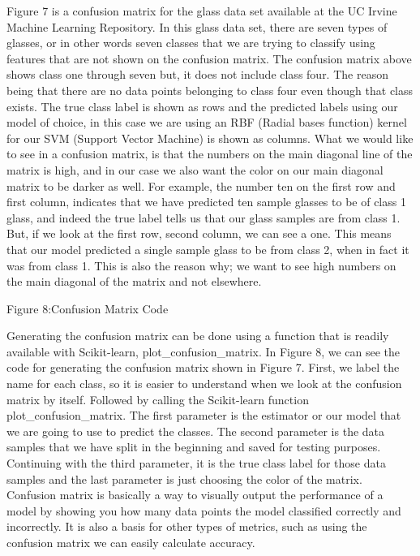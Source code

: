 \documentclass[a4paper,12pt]{report}
\begin{document}
Figure 7 is a confusion matrix for the glass data set available at the UC Irvine Machine Learning Repository. In this glass data set, there are seven types of glasses, or in other words seven classes that we are trying to classify using features that are not shown on the confusion matrix. The confusion matrix above shows class one through seven but, it does not include class four. The reason being that there are no data points belonging to class four even though that class exists. The true class label is shown as rows and the predicted labels using our model of choice, in this case we are using an RBF (Radial bases function) kernel for our SVM (Support Vector Machine) is shown as columns. What we would like to see in a confusion matrix, is that the numbers on the main diagonal line of the matrix is high, and in our case we also want the color on our main diagonal matrix to be darker as well. For example, the number ten on the first row and first column, indicates that we have predicted ten sample glasses to be of class 1 glass, and indeed the true label tells us that our glass samples are from class 1. But, if we look at the first row, second column, we can see a one. This means that our model predicted a single sample glass to be from class 2, when in fact it was from class 1. This is also the reason why; we want to see high numbers on the main diagonal of the matrix and not elsewhere.


Figure 8:Confusion Matrix Code

Generating the confusion matrix can be done using a function that is readily available with Scikit-learn, plot\_confusion\_matrix. In Figure 8, we can see the code for generating the confusion matrix shown in Figure 7. First, we label the name for each class, so it is easier to understand when we look at the confusion matrix by itself. Followed by calling the Scikit-learn function plot\_confusion\_matrix. The first parameter is the estimator or our model that we are going to use to predict the classes. The second parameter is the data samples that we have split in the beginning and saved for testing purposes. Continuing with the third parameter, it is the true class label for those data samples and the last parameter is just choosing the color of the matrix. Confusion matrix is basically a way to visually output the performance of a model by showing you how many data points the model classified correctly and incorrectly. It is also a basis for other types of metrics, such as using the confusion matrix we can easily calculate accuracy.
\end{document}
